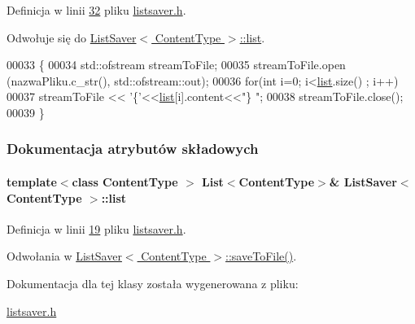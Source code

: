 Definicja w linii \hyperlink{listsaver_8h_source_l00032}{32} pliku \hyperlink{listsaver_8h_source}{listsaver.\-h}.



Odwołuje się do \hyperlink{listsaver_8h_source_l00019}{List\-Saver$<$ Content\-Type $>$\-::list}.


\begin{DoxyCode}
00033         \{
00034                 std::ofstream streamToFile;
00035                 streamToFile.open (nazwaPliku.c\_str(), std::ofstream::out);
00036                 \textcolor{keywordflow}{for}(\textcolor{keywordtype}{int} i=0; i<\hyperlink{class_list_saver_a6af039caf1e8895cf77097a942bd870d}{list}.size() ; i++)
00037                         streamToFile << \textcolor{charliteral}{'\{'}<<\hyperlink{class_list_saver_a6af039caf1e8895cf77097a942bd870d}{list}[i].content<<\textcolor{stringliteral}{"\} "};
00038                 streamToFile.close();
00039         \}
\end{DoxyCode}


\subsubsection{Dokumentacja atrybutów składowych}
\hypertarget{class_list_saver_a6af039caf1e8895cf77097a942bd870d}{
\paragraph[{list}]{\setlength{\rightskip}{0pt plus 5cm}template$<$class Content\-Type $>$ {\bf List}$<$Content\-Type$>$\& {\bf List\-Saver}$<$ Content\-Type $>$\-::list\hspace{0.3cm}{\ttfamily [private]}}}\label{class_list_saver_a6af039caf1e8895cf77097a942bd870d}


Definicja w linii \hyperlink{listsaver_8h_source_l00019}{19} pliku \hyperlink{listsaver_8h_source}{listsaver.\-h}.



Odwołania w \hyperlink{listsaver_8h_source_l00032}{List\-Saver$<$ Content\-Type $>$\-::save\-To\-File()}.



Dokumentacja dla tej klasy została wygenerowana z pliku\-:\begin{DoxyCompactItemize}
\item 
\hyperlink{listsaver_8h}{listsaver.\-h}\end{DoxyCompactItemize}
